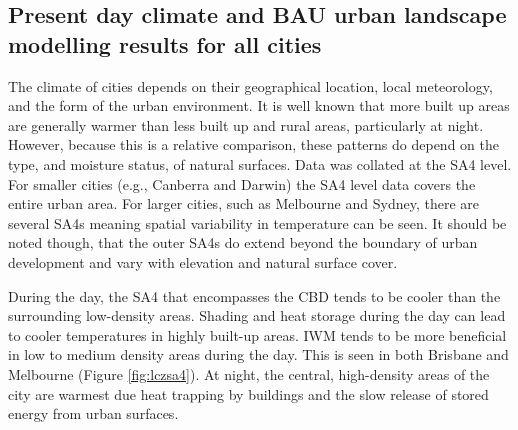 \documentclass[utf8]{frontiersSCNS} %
\begin{document}
\subsection{Present day climate and BAU urban landscape modelling results for all cities}\label{sec:results1}


The climate of cities depends on their geographical location, local meteorology, and the form of the urban environment. It is well known that more built up areas are generally warmer than less built up and rural areas, particularly at night. However, because this is a relative comparison, these patterns do depend on the type, and moisture status, of natural surfaces. Data was collated at the SA4 level. For smaller cities (e.g., Canberra and Darwin) the SA4 level data covers the entire urban area. For larger cities, such as Melbourne and Sydney, there are several SA4s meaning spatial variability in temperature can be seen. It should be noted though, that the outer SA4s do extend beyond the boundary of urban development and vary with elevation and natural surface cover.

During the day, the SA4 that encompasses the CBD tends to be cooler than the surrounding low-density areas. Shading and heat storage during the day can lead to cooler temperatures in highly built-up areas. IWM tends to be more beneficial in low to medium density areas during the day. This is seen in both Brisbane and Melbourne (Figure \ref{fig:lczsa4}). At night, the central, high-density areas of the city are warmest due heat trapping by buildings and the slow release of stored energy from urban surfaces. 
\end{document}
